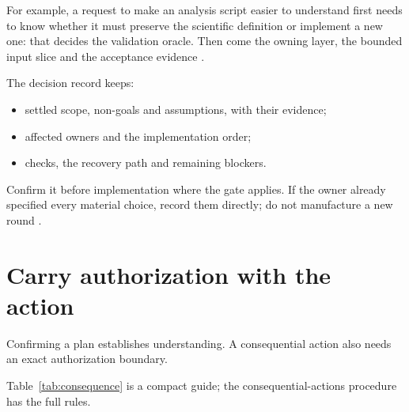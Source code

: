For example, a request to make an analysis script easier to understand first needs to
know whether it must preserve the scientific definition or implement a new one: that
decides the validation oracle. Then come the owning layer, the bounded input slice and
the acceptance evidence \cite[Establish the scientific contract]{skill:coding}.

The decision record keeps:
\begin{itemize}
  \item settled scope, non-goals and assumptions, with their evidence;
  \item affected owners and the implementation order;
  \item checks, the recovery path and remaining blockers.
\end{itemize}
Confirm it before implementation where the gate applies. If the owner already specified
every material choice, record them directly; do not manufacture a new round \cite[Confirm
  the decision record; Work the frontier]{skill:grilling}.

\section{Carry authorization with the action}

\begin{headline}
  Confirming a plan establishes understanding. A consequential action also needs an exact
  authorization boundary.
\end{headline}

Table~\ref{tab:consequence} is a compact guide; the consequential-actions procedure has
the full rules.

